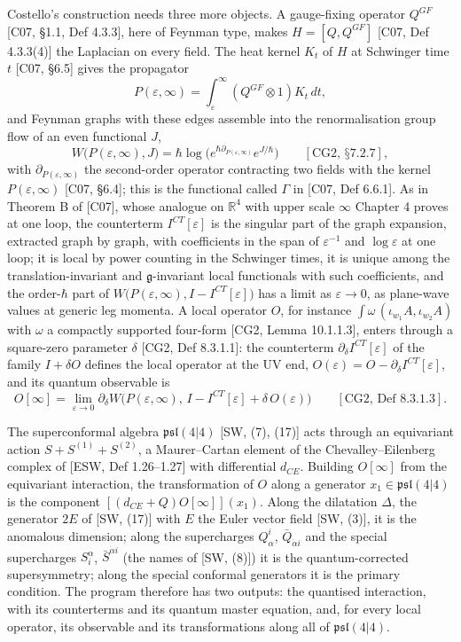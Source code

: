 Costello's construction needs three more objects. A gauge-fixing operator $Q^{GF}$ [C07, §1.1, Def 4.3.3], here of Feynman type, makes $H=[Q,Q^{GF}]$ [C07, Def 4.3.3(4)] the Laplacian on every field. The heat kernel $K_t$ of $H$ at Schwinger time $t$ [C07, §6.5] gives the propagator
\[
P(\varepsilon,\infty)=\int_\varepsilon^\infty(Q^{GF}\otimes1)K_t\,dt ,
\]
and Feynman graphs with these edges assemble into the renormalisation group flow of an even functional $J$,
\[
W\big(P(\varepsilon,\infty),J\big)=\hbar\log\Big(e^{\hbar\partial_{P(\varepsilon,\infty)}}e^{J/\hbar}\Big)\qquad[\text{CG2, §7.2.7}],
\]
with $\partial_{P(\varepsilon,\infty)}$ the second-order operator contracting two fields with the kernel $P(\varepsilon,\infty)$ [C07, §6.4]; this is the functional called $\Gamma$ in [C07, Def 6.6.1]. As in Theorem B of [C07], whose analogue on $\mathbb R^4$ with upper scale $\infty$ Chapter 4 proves at one loop, the counterterm $I^{CT}[\varepsilon]$ is the singular part of the graph expansion, extracted graph by graph, with coefficients in the span of $\varepsilon^{-1}$ and $\log\varepsilon$ at one loop; it is local by power counting in the Schwinger times, it is unique among the translation-invariant and $\mathfrak g$-invariant local functionals with such coefficients, and the order-$\hbar$ part of $W\big(P(\varepsilon,\infty),I-I^{CT}[\varepsilon]\big)$ has a limit as $\varepsilon\to0$, as plane-wave values at generic leg momenta. A local operator $O$, for instance $\int\omega\,(\iota_{w_1}A,\iota_{w_2}A)$ with $\omega$ a compactly supported four-form [CG2, Lemma 10.1.1.3], enters through a square-zero parameter $\delta$ [CG2, Def 8.3.1.1]: the counterterm $\partial_\delta I^{CT}[\varepsilon]$ of the family $I+\delta O$ defines the local operator at the UV end, $O(\varepsilon)=O-\partial_\delta I^{CT}[\varepsilon]$, and its quantum observable is
\[
O[\infty]=\lim_{\varepsilon\to0}\partial_\delta W\big(P(\varepsilon,\infty),\,I-I^{CT}[\varepsilon]+\delta\,O(\varepsilon)\big)\qquad[\text{CG2, Def 8.3.1.3}].
\]

The superconformal algebra $\mathfrak{psl}(4|4)$ [SW, (7), (17)] acts through an equivariant action $S+S^{(1)}+S^{(2)}$, a Maurer--Cartan element of the Chevalley--Eilenberg complex of [ESW, Def 1.26--1.27] with differential $d_{CE}$. Building $O[\infty]$ from the equivariant interaction, the transformation of $O$ along a generator $x_1\in\mathfrak{psl}(4|4)$ is the component $[(d_{CE}+Q)O[\infty]](x_1)$. Along the dilatation $\Delta$, the generator $2E$ of [SW, (17)] with $E$ the Euler vector field [SW, (3)], it is the anomalous dimension; along the supercharges $Q^i_\alpha$, $\bar Q_{\dot\alpha i}$ and the special supercharges $S^\alpha_i$, $\bar S^{\dot\alpha i}$ (the names of [SW, (8)]) it is the quantum-corrected supersymmetry; along the special conformal generators it is the primary condition. The program therefore has two outputs: the quantised interaction, with its counterterms and its quantum master equation, and, for every local operator, its observable and its transformations along all of $\mathfrak{psl}(4|4)$.

